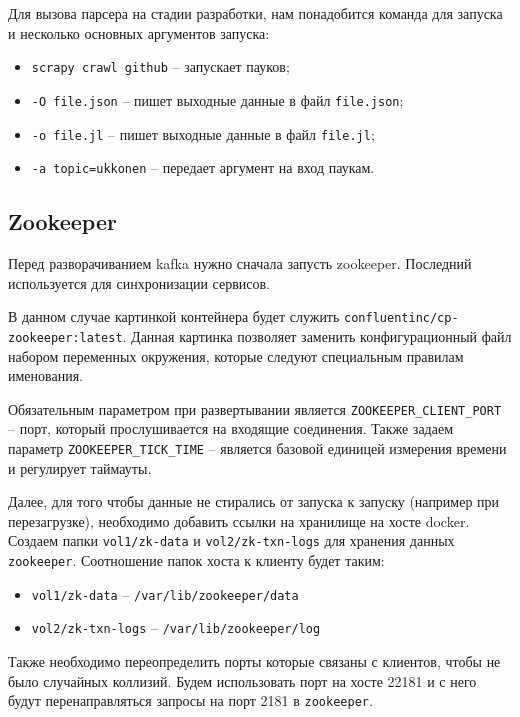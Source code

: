 Для вызова парсера на стадии разработки, нам понадобится команда для запуска и
несколько основных аргументов запуска:
\begin{itemize}
    \item \verb|scrapy crawl github| -- запускает пауков;
    \item \verb|-O file.json| -- пишет выходные данные в файл \verb|file.json|;
    \item \verb|-o file.jl| -- пишет выходные данные в файл \verb|file.jl|;
    \item \verb|-a topic=ukkonen| -- передает аргумент на вход паукам.
\end{itemize}

\subsection{Zookeeper}
Перед разворачиванием kafka нужно сначала запусть zookeeper. Последний используется для синхронизации сервисов.

В данном случае картинкой контейнера будет служить
\verb|confluentinc/cp-zookeeper:latest|. Данная картинка позволяет заменить
конфигурационный файл набором переменных окружения, которые следуют специальным
правилам именования.

Обязательным параметром при развертывании является \verb|ZOOKEEPER_CLIENT_PORT|
-- порт, который прослушивается на входящие соединения. Также задаем параметр
\verb|ZOOKEEPER_TICK_TIME| -- является базовой единицей измерения времени и
регулирует таймауты.

Далее, для того чтобы данные не стирались от запуска к запуску (например при
перезагрузке), необходимо добавить ссылки на хранилище на хосте docker. Создаем
папки \verb|vol1/zk-data| и \verb|vol2/zk-txn-logs| для хранения данных
\verb|zookeeper|. Соотношение папок хоста к клиенту будет таким:
\begin{itemize}
    \item \verb|vol1/zk-data| -- \verb|/var/lib/zookeeper/data|
    \item \verb|vol2/zk-txn-logs| -- \verb|/var/lib/zookeeper/log|
\end{itemize}

Также необходимо переопределить порты которые связаны с клиентов, чтобы не было
случайных коллизий. Будем использовать порт на хосте 22181 и с него будут
перенаправляться запросы на порт 2181 в \verb|zookeeper|.

